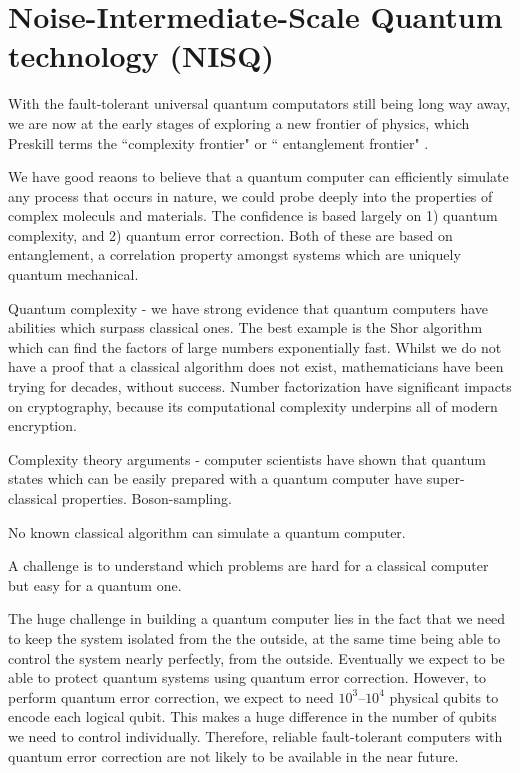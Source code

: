 \section{Noise-Intermediate-Scale Quantum technology (NISQ)}

With the fault-tolerant universal quantum computators still being long way away, we are now
at the early stages of exploring a new frontier of physics, which Preskill terms the 
``complexity frontier" or `` entanglement frontier" \cite{}.

We have good reaons to believe that a quantum computer can efficiently simulate any process that occurs in nature, we could probe deeply into the properties of complex moleculs and materials. The confidence is based largely on 1) quantum complexity, and 2) quantum error correction. Both of these are based on entanglement, a correlation property amongst systems which are uniquely quantum mechanical. 

Quantum complexity - we have strong evidence that quantum computers have abilities which surpass classical ones. The best example is the Shor algorithm \cite{} which can find the factors of large numbers exponentially fast. Whilst we do not have a proof that a classical algorithm does not exist, mathematicians have been trying for decades, without success. Number factorization have significant impacts on cryptography, because its computational complexity underpins all of modern encryption. 

Complexity theory arguments - computer scientists have shown that quantum states which 
can be easily prepared with a quantum computer have super-classical properties. Boson-sampling.

No known classical algorithm can simulate a quantum computer.

A challenge is to understand which problems are hard for a classical computer but easy for a quantum one.


The huge challenge in building a quantum computer lies in the fact that we need to keep the system isolated from the the outside, at the same time being able to control the system nearly perfectly, from the outside. Eventually we expect to be able to protect quantum systems using quantum error correction. However, to perform quantum error correction, we expect to need $10^3 – 10^4$ physical qubits to encode each logical qubit. This makes a huge difference in the number of qubits we need to control individually. Therefore, reliable fault-tolerant computers with quantum error correction are not likely to be available in the near future.





